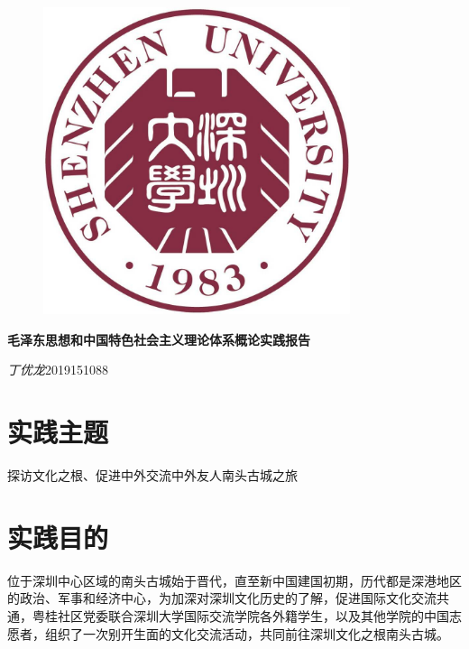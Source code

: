 \documentclass[UTF8]{ctexart}
\begin{document}
\fancyhf{}
\begin{titlepage}
    \begin{figure}[h]
        \centering
        \includegraphics[width=9cm]{imgs/logo.jpg}
    \end{figure}
    \vskip 35mm
    \begin{center}
        \normalfont
        {\Large\bfseries 毛泽东思想和中国特色社会主义理论体系概论实践报告}
        
        \vskip 10mm

        \vskip 30mm
        {\Large\itshape 丁优龙}{\Large 2019151088}

        
        
    \end{center}
\end{titlepage}
\clearpage
\section*{\Large 实践主题}
探访文化之根、促进中外交流\raisebox{0.5mm}{------}中外友人南头古城之旅
\section*{\Large 实践目的}
位于深圳中心区域的南头古城始于晋代，直至新中国建国初期，历代都是深港地区的政治、军事和经济中心，为加深对深圳文化历史的了解，促进国际文化交流共通，粤桂社区党委联合深圳大学国际交流学院各外籍学生，以及其他学院的中国志愿者，组织了一次别开生面的文化交流活动，共同前往深圳文化之根南头古城。
\end{document}
